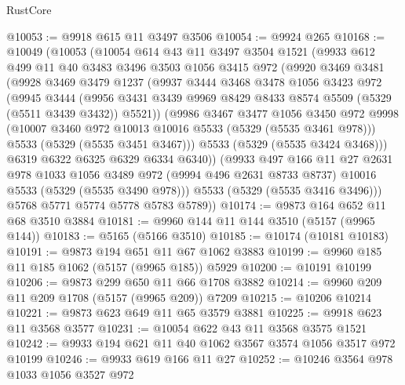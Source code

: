 \begin{lexlean}{RustCore}
\begin{coremodule}
@10053 := @9918 @615 @11 @3497 @3506
@10054 := @9924 @265
@10168 := @10049
    (@10053
      (@10054
        @614
        @43
        @11
        @3497
        @3504
        @1521
        (@9933
          @612
          @499
          @11
          @40
          @3483
          @3496
          @3503
          @1056
          @3415
          @972
          (@9920
            @3469
            @3481
            (@9928
              @3469
              @3479
              @1237
              (@9937
                @3444
                @3468
                @3478
                @1056
                @3423
                @972
                (@9945
                  @3444
                  (@9956
                    @3431
                    @3439
                    @9969
                    @8429
                    @8433
                    @8574
                    @5509
                    (@5329 (@5511 @3439 @3432))
                    @5521))
                (@9986
                  @3467
                  @3477
                  @1056
                  @3450
                  @972
                  @9998
                  (@10007 @3460 @972 @10013 @10016 @5533 (@5329 (@5535 @3461 @978)))
                  @5533
                  (@5329 (@5535 @3451 @3467)))
                @5533
                (@5329 (@5535 @3424 @3468)))
              @6319
              @6322
              @6325
              @6329
              @6334
              @6340))
          (@9933
            @497
            @166
            @11
            @27
            @2631
            @978
            @1033
            @1056
            @3489
            @972
            (@9994 @496 @2631 @8733 @8737)
            @10016
            @5533
            (@5329 (@5535 @3490 @978)))
          @5533
          (@5329 (@5535 @3416 @3496)))
        @5768
        @5771
        @5774
        @5778
        @5783
        @5789))
@10174 := @9873 @164 @652 @11 @68 @3510 @3884
@10181 := @9960 @144 @11 @144 @3510 (@5157 (@9965 @144))
@10183 := @5165 (@5166 @3510)
@10185 := @10174 (@10181 @10183)
@10191 := @9873 @194 @651 @11 @67 @1062 @3883
@10199 := @9960 @185 @11 @185 @1062 (@5157 (@9965 @185)) @5929
@10200 := @10191 @10199
@10206 := @9873 @299 @650 @11 @66 @1708 @3882
@10214 := @9960 @209 @11 @209 @1708 (@5157 (@9965 @209)) @7209
@10215 := @10206 @10214
@10221 := @9873 @623 @649 @11 @65 @3579 @3881
@10225 := @9918 @623 @11 @3568 @3577
@10231 := @10054 @622 @43 @11 @3568 @3575 @1521
@10242 := @9933 @194 @621 @11 @40 @1062 @3567 @3574 @1056 @3517 @972 @10199
@10246 := @9933 @619 @166 @11 @27
@10252 := @10246 @3564 @978 @1033 @1056 @3527 @972

\end{coremodule}
\end{lexlean}
